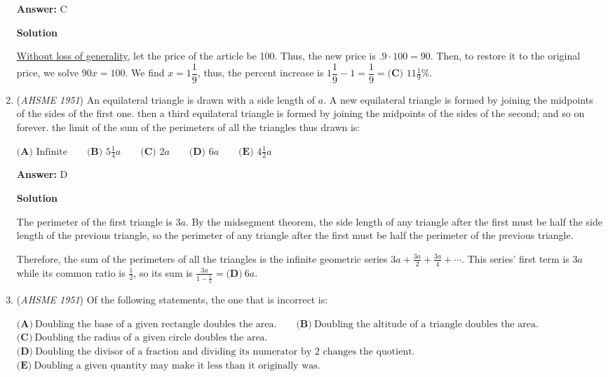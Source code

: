 \begin{enumerate}
 \textbf{Answer: }C



\textbf{Solution}

\href{https://artofproblemsolving.com/wiki/index.php?title=Without\_loss\_of\_generality}{Without loss of generality}, let the price of the article be 100. Thus, the new price is $.9\cdot  100= 90$. Then, to restore it to the original price, we solve $90x=100$. We find $x=1\dfrac{1}{9}$, thus, the percent increase is $1\dfrac{1}{9}-1=\dfrac{1}{9}=\boxed{\textbf{(C) \ } 11\frac{1}{9}\%}$.

 


	\item (\textit{AHSME 1951}) An equilateral triangle is drawn with a side length of $a.$ A new equilateral triangle is formed by joining the midpoints of the sides of the first one. then a third equilateral triangle is formed by joining the midpoints of the sides of the second; and so on forever. the limit of the sum of the perimeters of all the triangles thus drawn is:


 $\textbf{(A) \ } \text{Infinite} \qquad\textbf{(B) \ } 5\frac{1}{4}a \qquad \textbf{(C) \ } 2a \qquad\textbf{(D) \ } 6a \qquad\textbf{(E) \ } 4\frac{1}{2}a$

 \textbf{Answer: }D



\textbf{Solution}

The perimeter of the first triangle is $3a$. By the midsegment theorem, the side length of any triangle after the first must be half the side length of the previous triangle, so the perimeter of any triangle after the first must be half the perimeter of the previous triangle. 

 Therefore, the sum of the perimeters of all the triangles is the infinite geometric series $3a+\frac{3a}{2}+\frac{3a}{4}+\cdots$.  This series' first term is $3a$ while its common ratio is $\frac{1}{2}$, so its sum is $\frac{3a}{1-\frac{1}{2}}=\boxed{\textbf{(D)}\ 6a}$.

 


	\item (\textit{AHSME 1951}) Of the following statements, the one that is incorrect is:


 $\textbf{(A)}\ \text{Doubling the base of a given rectangle doubles the area.}\qquad\textbf{(B)}\ \text{Doubling the altitude of a triangle doubles the area.}$
$\textbf{(C)}\ \text{Doubling the radius of a given circle doubles the area.}$
$\textbf{(D)}\ \text{Doubling the divisor of a fraction and dividing its numerator by 2 changes the quotient.}$
$\textbf{(E)}\ \text{Doubling a given quantity may make it less than it originally was.}$


\end{enumerate}
